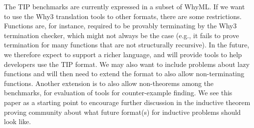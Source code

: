 \documentclass{llncs}
\begin{document}
The TIP benchmarks are currently expressed in a subset of WhyML. If we want to use the Why3 translation tools to other formats, there are some restrictions. Functions are, for instance, required to be provably terminating by the Why3 termination checker, which might not always be the case (e.g., it fails to prove termination for many functions that are not structurally recursive).
In the future, we therefore expect to support a richer language, and will provide tools to help developers use the TIP format.
We may also want to include problems about lazy functions and will then need to extend the format to also allow non-terminating functions.
Another extension is to also allow non-theorems among the benchmarks, for evaluation of tools for counter-example finding.  We see this paper as a starting point to encourage further discussion in the inductive theorem proving community about what future format(s) for inductive problems should look like.





\end{document}
